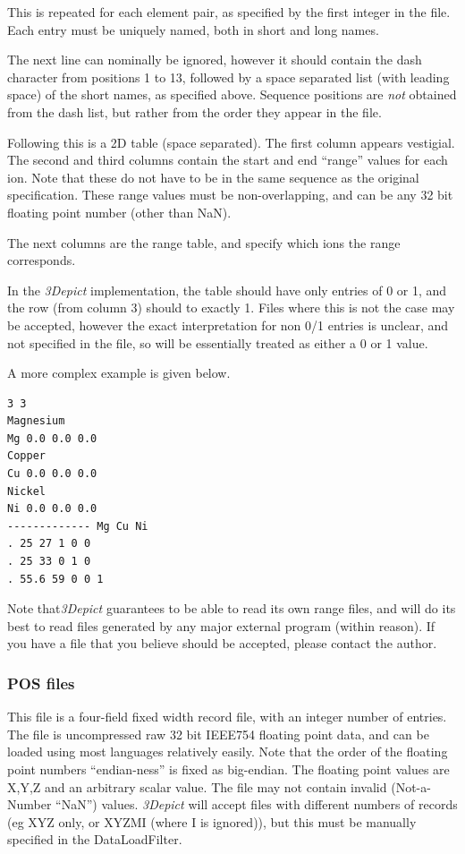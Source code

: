 \documentclass[10pt]{article}
\begin{document}
This is repeated for each element pair, as specified by the first integer in the file. Each entry must be uniquely named, both in short and long names.

The next line can nominally be ignored, however it should contain the dash character from positions 1 to 13, followed by a space separated list (with leading space) of the short names, as specified above. Sequence positions are \emph{not} obtained from the dash list, but rather from the order they appear in the file.

Following this is a 2D table (space separated). The first column appears vestigial. The second and third columns contain the start and end ``range'' values for each ion. Note that these do not have to be in the same sequence as the original specification. These range values must be non-overlapping, and can be any 32 bit floating point number (other than NaN).

The next columns are the range table, and specify which ions the range corresponds.

In the \emph{3Depict} implementation, the table should have only entries of 0 or 1, and the row  (from column 3) should to exactly 1. Files where this is not the case may be accepted, however the exact interpretation for non 0/1 entries is unclear, and not specified in the file, so will be essentially treated as either a 0 or 1 value. 

A more complex example is given below.

\begin{verbatim}
3 3
Magnesium
Mg 0.0 0.0 0.0
Copper
Cu 0.0 0.0 0.0
Nickel
Ni 0.0 0.0 0.0
------------- Mg Cu Ni
. 25 27 1 0 0
. 25 33 0 1 0
. 55.6 59 0 0 1
\end{verbatim}

Note that\emph{3Depict} guarantees to be able to read its own range files, and will do its best to read files generated by any major external program (within reason). If you have a file that you believe should be accepted, please contact the author.

\subsubsection{POS files}
\label{sec:posformat}
This file is a four-field fixed width record file, with an integer number of entries. The file is uncompressed raw 32 bit IEEE754 floating point data, and can be loaded using most languages relatively easily. Note that the order of the floating point numbers ``endian-ness'' is fixed as big-endian. The floating point values are X,Y,Z and an arbitrary scalar value. The file may not contain invalid (Not-a-Number ``NaN'') values. \emph{3Depict} will accept files with different numbers of records (eg XYZ only, or XYZMI (where I is ignored)), but this must be manually specified in the DataLoadFilter.
\end{document}
